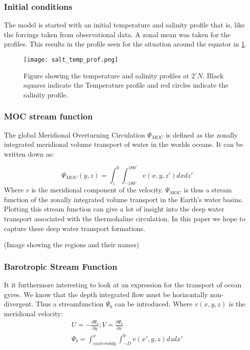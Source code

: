 \begin{multicols}{2}
 \subsubsection{Initial conditions}
The model is started with an initial temperature and salinity profile that is, like the forcings taken from observational data. A zonal mean was taken for the profiles. This results in the profile seen for the situation around the equator in \cref{fig:salt_temp_prf}.

\begin{figure}[H]
	\texttt{[image: salt\_temp\_prof.png]}
	\caption{Figure showing the temperature and salinity profiles at $2^{\circ} N$. Black squares indicate the Temperature profile and red circles indicate the salinity profile.}
	\label{fig:salt_temp_prf}
\end{figure}
 
 \subsubsection{MOC stream function} \label{sec:MOCSTREAM}
 
 The global Meridional Overturning Circulation $\Psi_{MOC}$ is defined as the zonally integrated meridional volume transport of water in the worlds oceans. It can be written down as:
 
 $$
 \Psi_{MOC}(y,z) = \int_{z}^{0} \int_{-180^{\circ}}^{180^{\circ}} v(x,y,z') dx dz'
 $$
Where $v$ is the meridional component of the velocity.
$ \Psi_{MOC}$ is thus a stream function of the zonally integrated volume transport in the Earth's water basins. Plotting this stream function can give a lot of insight into the deep water transport associated with the thermohaline circulation. In this paper we hope to capture these deep water transport formations.

(Image showing the regions and their names)

\subsubsection{Barotropic Stream Function} \label{sec:BSF_theory}
It it furthermore interesting to look at an expression for the transport of ocean gyres. We know that the depth integrated flow must be horizontally non-divergent. Thus a streamfunction $\Psi_{b}$ can be introduced. Where $v(x,y,z)$ is the meridional velocity:
\begin{align}
U = -\frac{\partial \Psi_{b}}{\partial y}; V=\frac{\partial \Psi_{b}}{\partial x} \\
\Psi_{b} = \int_{eastern bdy}^{x} \int_{-D}^{0} v(x',y,z) dz dx'
\end{align}


\end{multicols}
